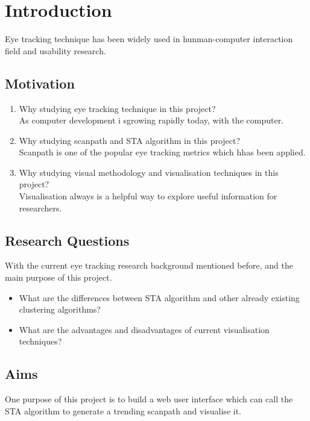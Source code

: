 \documentclass{report}
\begin{document}
	\chapter{Introduction}
	Eye tracking technique has been widely used in hunman-computer interaction field and usability research.
	
		\section{Motivation}
			\begin{enumerate}
				\item Why studying eye tracking technique in this project? \\
				As computer development i sgrowing rapidly today, with the computer.
				
				\item Why studying scanpath and STA algorithm in this project? \\
				Scanpath is one of the popular eye tracking metrics which hhas been applied.
				
				\item Why studying visual methodology and visualisation techniques in this project? \\
				Visualisation always is a helpful way to explore useful information for researchers.
			\end{enumerate}
		
		\section{Research Questions}
		With the current eye tracking research background mentioned before, and the main purpose of this project.
			\begin{itemize}
				\item What are the differences between STA algorithm and other already existing clustering algorithms?
				
				\item What are the advantages and disadvantages of current visualisation techniques?
			\end{itemize}
		
		\section{Aims}
		One  purpose of this project is to build a web user interface which can call the STA algorithm to generate a trending scanpath and visualise it.
		
\end{document}
